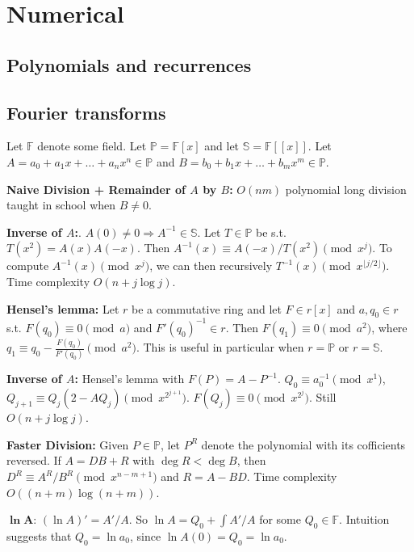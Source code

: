 \chapter{Numerical}

\section{Polynomials and recurrences}

\section{Fourier transforms}
Let $\mathbb{F}$ denote some field.
Let $\mathbb{P} = \mathbb{F}[x]$
and let $\mathbb{S} = \mathbb{F}[[x]]$.
Let $A = a_0 + a_1 x + \dots + a_n x^n \in \mathbb{P}$ 
and $B = b_0 + b_1 x + \dots + b_m x^m \in \mathbb{P}$.

\textbf{Naive Division + Remainder of $A$ by $B$:} $O(nm)$ polynomial long division taught in school when $B \ne 0$.

\textbf{Inverse of $A$:}. $A(0) \ne 0 \Rightarrow A^{-1} \in \mathbb{S}$. Let $T \in \mathbb{P}$ be s.t. $T(x^2) = A(x)A(-x)$. Then $A^{-1}(x) \equiv A(-x) / T\left(x^2\right) \pmod{x^j}$. To compute $A^{-1}(x) \pmod{x^j}$, we can then recursively $T^{-1}(x) \pmod{x^{\lfloor j/2 \rfloor}}$. Time complexity $O(n + j \log j)$.

\textbf{Hensel's lemma:} Let $r$ be a commutative ring and let $F \in r[x]$ and $a, q_0 \in r$ s.t. $F(q_0) \equiv 0 \pmod{a}$ and $F'(q_0)^{-1} \in r$. Then $F(q_1) \equiv 0 \pmod{a^2}$, where $ q_1 \equiv q_0 - \frac{F(q_0)}{F'(q_0)} \pmod{a^2}$. This is useful in particular when $r = \mathbb{P}$ or $r = \mathbb{S}$.

\textbf{Inverse of $A$:} Hensel's lemma with $F(P) = A - P^{-1}$. $Q_0 \equiv a_0^{-1} \pmod{x^1}$, $Q_{j+1} \equiv Q_{j} \left(2 - AQ_j \right) \pmod{x^{2^{j+1}}}$. $F(Q_j) \equiv 0 \pmod{x^{2^j}}$. Still $O(n + j \log{j})$.

\textbf{Faster Division:} Given $P \in \mathbb{P}$, let $P^R$ denote the polynomial with its cofficients reversed. If $A = DB + R$ with $\deg{R} < \deg{B}$, then $D^R \equiv A^R / B^R \pmod{x^{n - m + 1}}$ and $R = A - BD$. Time complexity $O((n + m) \log{\left(n + m\right)})$.

$\mathbf{\ln A}$: $\left(\ln{A}\right)' = A'/A$. So $\ln{A} = Q_0 + \int A'/A$ for some $Q_0 \in \mathbb{F}$. Intuition suggests that $Q_0 = \ln{a_0}$, since $\ln{A(0)} = Q_0 = \ln{a_0}$.

